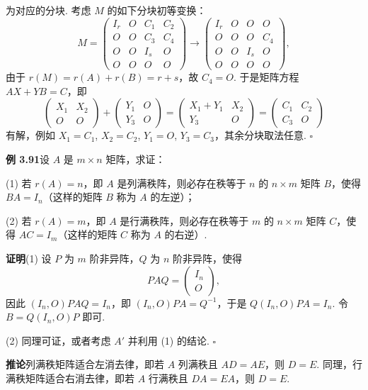 \documentclass[UTF8, 12pt, fontset=fandol, oneside]{ctexart}
\begin{document}
为对应的分块. 考虑 $M$ 的如下分块初等变换：
\[
M=
\begin{pmatrix}
I_r&O&C_1&C_2\\
O&O&C_3&C_4\\
O&O&I_s&O\\
O&O&O&O
\end{pmatrix}
\longrightarrow
\begin{pmatrix}
I_r&O&O&O\\
O&O&O&C_4\\
O&O&I_s&O\\
O&O&O&O
\end{pmatrix},
\]
由于 $r(M)=r(A)+r(B)=r+s$，故 $C_4=O$. 于是矩阵方程 $AX+YB=C$，即
\[
\begin{pmatrix}X_1&X_2\\O&O\end{pmatrix}
+
\begin{pmatrix}Y_1&O\\Y_3&O\end{pmatrix}
=
\begin{pmatrix}X_1+Y_1&X_2\\Y_3&O\end{pmatrix}
=
\begin{pmatrix}C_1&C_2\\C_3&O\end{pmatrix}
\]
有解，例如 $X_1=C_1$, $X_2=C_2$, $Y_1=O$, $Y_3=C_3$，其余分块取法任意. $\square$

\noindent\textbf{例 3.91}\quad 设 $A$ 是 $m\times n$ 矩阵，求证：

(1) 若 $r(A)=n$，即 $A$ 是列满秩阵，则必存在秩等于 $n$ 的 $n\times m$ 矩阵 $B$，使得 $BA=I_n$（这样的矩阵 $B$ 称为 $A$ 的左逆）；

(2) 若 $r(A)=m$，即 $A$ 是行满秩阵，则必存在秩等于 $m$ 的 $n\times m$ 矩阵 $C$，使得 $AC=I_m$（这样的矩阵 $C$ 称为 $A$ 的右逆）.

\noindent\textbf{证明}\quad (1) 设 $P$ 为 $m$ 阶非异阵，$Q$ 为 $n$ 阶非异阵，使得
\[
PAQ=\begin{pmatrix}I_n\\O\end{pmatrix},
\]
因此 $(I_n,O)PAQ=I_n$，即 $(I_n,O)PA=Q^{-1}$，于是 $Q(I_n,O)PA=I_n$. 令 $B=Q(I_n,O)P$ 即可.

(2) 同理可证，或者考虑 $A'$ 并利用 (1) 的结论. $\square$

\noindent\textbf{推论}\quad 列满秩矩阵适合左消去律，即若 $A$ 列满秩且 $AD=AE$，则 $D=E$. 同理，行满秩矩阵适合右消去律，即若 $A$ 行满秩且 $DA=EA$，则 $D=E$.
\end{document}

